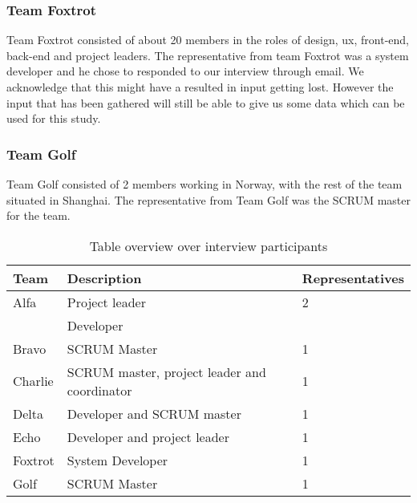 \subsubsection{Team Foxtrot}
Team Foxtrot consisted of about 20 members in the roles of design, ux, front-end, back-end and project leaders. The representative from team Foxtrot was a system developer and he chose to responded to our interview through email. We acknowledge that this might have a resulted in input getting lost. However the input that has been gathered will still be able to give us some data which can be used for this study. 

\subsubsection{Team Golf}
Team Golf consisted of 2 members working in Norway, with the rest of the team situated in Shanghai. The representative from Team Golf was the SCRUM master for the team. 

\begin{table}[!h]
	\begin{center}
	\caption{Table overview over interview participants}
	\label{table:participants}
	\begin{tabular}{l p{} l}
	\hline
	Team & Description & Representatives\\
	\hline
	Alfa & Project leader & 2 \\
	& Developer & \\
	Bravo & SCRUM Master & 1  \\
	Charlie & SCRUM master, project leader and coordinator & 1 \\
	Delta & Developer and SCRUM master & 1 \\
	Echo & Developer and project leader & 1 \\
	Foxtrot & System Developer & 1 \\
	Golf & SCRUM Master & 1 \\
	\hline
	\end{tabular}
	\end{center}
\end{table}

\clearpage